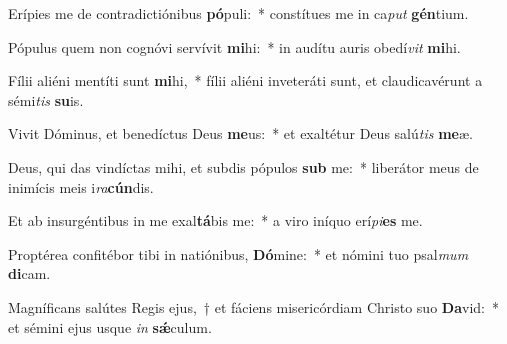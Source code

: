 \item Erípies me de contradictiónibus \textbf{pó}puli:~* constítues me in ca\textit{put} \textbf{gén}tium.
\item Pópulus quem non cognóvi servívit \textbf{mi}hi:~* in audítu auris obedí\textit{vit} \textbf{mi}hi.
\item Fílii aliéni mentíti sunt \textbf{mi}hi,~* fílii aliéni inveteráti sunt, et claudicavérunt a sémi\textit{tis} \textbf{su}is.
\item Vivit Dóminus, et benedíctus Deus \textbf{me}us:~* et exaltétur Deus salú\textit{tis} \textbf{me}æ.
\item Deus, qui das vindíctas mihi, et subdis pópulos \textbf{sub} me:~* liberátor meus de inimícis meis i\textit{ra}\textbf{cún}dis.
\item Et ab insurgéntibus in me exal\textbf{tá}bis me:~* a viro iníquo erí\textit{pi}\textbf{es} me.
\item Proptérea confitébor tibi in natiónibus, \textbf{Dó}mine:~* et nómini tuo psal\textit{mum} \textbf{di}cam.
\item Magníficans salútes Regis ejus,~† et fáciens misericórdiam Christo suo \textbf{Da}vid:~* et sémini ejus usque \textit{in} \textbf{sǽ}culum.
